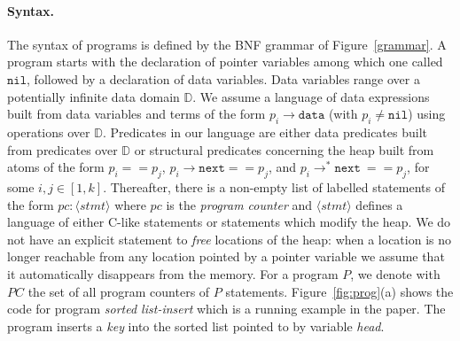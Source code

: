 \documentclass{llncs}
\newcommand{\next}{\texttt{next}}
\newcommand{\dom}{\mathbb{D}}
\newcommand{\data}{\texttt{data}}
\newcommand{\nil}{{\texttt{nil}}}
\newcommand{\PC}{\mathit{PC}}
\begin{document}
\paragraph{Syntax.}
The syntax of programs is defined by the BNF grammar of Figure~\ref{grammar}.
A program starts with the declaration of pointer variables among which one called $\nil$, followed by a declaration of data variables. Data variables range over a potentially infinite data domain $\dom$. We assume a language of data expressions built from data variables and terms of the form
$p_i\rightarrow \data$ (with $p_i\not=\nil$) using operations over $\dom$.
Predicates in our language are either data predicates built from predicates over $\dom$ or structural predicates concerning the heap built from atoms of the form $p_i == p_j$, $p_i\rightarrow\next == p_j$, and  $p_i\rightarrow^*\next\ == p_j$, for some $i,j\in[1,k]$. Thereafter, there is a non-empty list of labelled statements of the form
$\mathit{pc}\!:\! \langle \mathit{stmt}\rangle$ where $\mathit{pc}$ is the {\em program counter} and $\langle\mathit{stmt}\rangle$ defines a language of either C-like statements or statements which modify the heap.  We do not have an explicit statement to {\em free} locations of the heap: when a location is no longer reachable from any location pointed by a pointer variable we assume that it automatically disappears from the memory. For a program $P$, we denote with $\PC$ the set of all program counters of $P$ statements.
Figure~\ref{fig:prog}(a) shows the code for program \emph{sorted list-insert} which is a running example in the paper. The program inserts a \emph{key} into the sorted list pointed to by variable \emph{head}.
\end{document}
